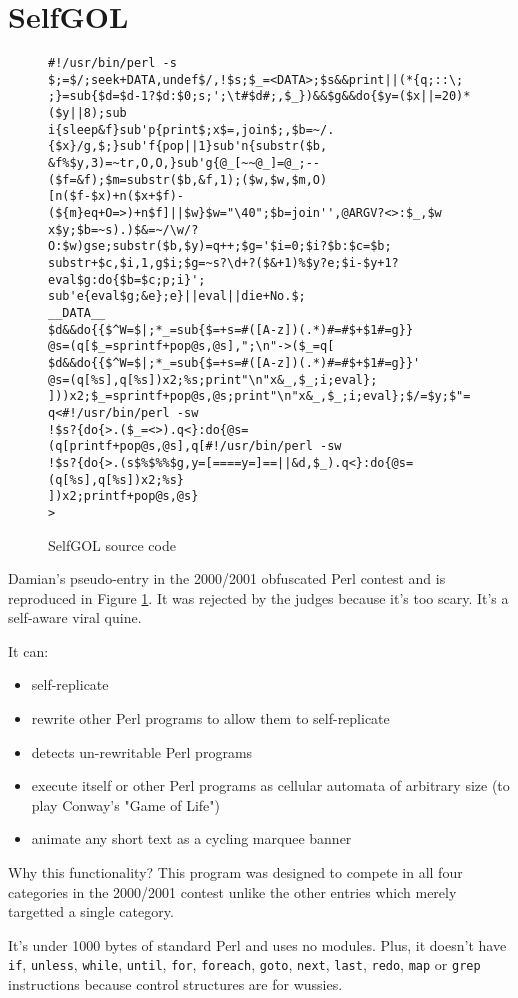\documentclass{article}
\begin{document}
\section{SelfGOL}
\begin{figure}
\caption{SelfGOL source code}\label{fig:selfgol}
\begin{verbatim}
#!/usr/bin/perl -s
$;=$/;seek+DATA,undef$/,!$s;$_=<DATA>;$s&&print||(*{q;::\;
;}=sub{$d=$d-1?$d:$0;s;';\t#$d#;,$_})&&$g&&do{$y=($x||=20)*($y||8);sub
i{sleep&f}sub'p{print$;x$=,join$;,$b=~/.{$x}/g,$;}sub'f{pop||1}sub'n{substr($b,
&f%$y,3)=~tr,O,O,}sub'g{@_[~~@_]=@_;--($f=&f);$m=substr($b,&f,1);($w,$w,$m,O)
[n($f-$x)+n($x+$f)-(${m}eq+O=>)+n$f]||$w}$w="\40";$b=join'',@ARGV?<>:$_,$w
x$y;$b=~s).)$&=~/\w/?O:$w)gse;substr($b,$y)=q++;$g='$i=0;$i?$b:$c=$b;
substr+$c,$i,1,g$i;$g=~s?\d+?($&+1)%$y?e;$i-$y+1?eval$g:do{$b=$c;p;i}';
sub'e{eval$g;&e};e}||eval||die+No.$;
__DATA__
$d&&do{{$^W=$|;*_=sub{$=+s=#([A-z])(.*)#=#$+$1#=g}}
@s=(q[$_=sprintf+pop@s,@s],";\n"->($_=q[
$d&&do{{$^W=$|;*_=sub{$=+s=#([A-z])(.*)#=#$+$1#=g}}'
@s=(q[%s],q[%s])x2;%s;print"\n"x&_,$_;i;eval};
]))x2;$_=sprintf+pop@s,@s;print"\n"x&_,$_;i;eval};$/=$y;$"=",";print
q<#!/usr/bin/perl -sw
!$s?{do{>.($_=<>).q<}:do{@s=(q[printf+pop@s,@s],q[#!/usr/bin/perl -sw
!$s?{do{>.(s$%$%%$g,y=[====y=]==||&d,$_).q<}:do{@s=(q[%s],q[%s])x2;%s}
])x2;printf+pop@s,@s}
>
\end{verbatim}
\end{figure}
Damian's pseudo-entry in the 2000/2001 obfuscated Perl contest and is
reproduced in Figure \ref{fig:selfgol}.  It was
rejected by the judges because it's too scary.  It's a self-aware viral quine.

It can:
\begin{itemize}
\item self-replicate
\item rewrite other Perl programs to allow them to self-replicate
\item detects un-rewritable Perl programs
\item execute itself or other Perl programs as cellular automata of
arbitrary size (to play Conway's "Game of Life")
\item animate any short text as a cycling marquee banner
\end{itemize}

Why this functionality?  This program was designed to compete in all
four categories in the 2000/2001 contest unlike
the other entries which merely targetted a single category.

It's under 1000 bytes of standard Perl and uses no modules.
Plus, it doesn't have \texttt{if}, \texttt{unless}, \texttt{while},
\texttt{until}, \texttt{for}, \texttt{foreach}, \texttt{goto},
\texttt{next}, \texttt{last},
\texttt{redo}, \texttt{map}
or \texttt{grep} instructions because control structures are for wussies.
\end{document}
